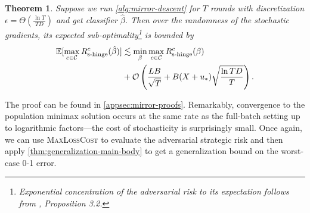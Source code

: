 \documentclass{article}
\newcommand{\costset}{\gC}
\newcommand{\costfunc}{c}
\newcommand{\shingepoprisk}{R_{\textrm{s-hinge}}}
\newcommand{\uinv}{\ensuremath{u_{*}}}
\newcommand{\cinc}{{\costfunc\in\costset}}
\newtheorem{theorem}{Theorem}[section]
\theoremstyle{definition}
\begin{document}
\begin{theorem}
    Suppose we run \cref{alg:mirror-descent} for $T$ rounds with discretization $\epsilon = \Theta\left(\frac{\ln T}{T D}\right)$ and get classifier $\hat\beta$.
    Then over the randomness of the stochastic gradients, its expected sub-optimality\footnote{Exponential concentration of the adversarial risk to its expectation follows from \citet{nemirovski2009robust}, Proposition 3.2.} is bounded by
    \begin{align*}
        \E[\max_{\cinc} \shingepoprisk^{\costfunc}(\hat\beta)] &\lesssim \min_{\beta} \max_{\cinc} \shingepoprisk^{\costfunc}(\beta) \\
        &+\mathcal{O}\left(\frac{LB}{\sqrt{T}}  + B (X+\uinv) \sqrt{\frac{\ln TD}{T}} \right).
    \end{align*}
\end{theorem}
The proof can be found in \cref{appsec:mirror-proofs}. Remarkably, convergence to the population minimax solution occurs at the same rate as the full-batch setting up to logarithmic factors---the cost of stochasticity is surprisingly small. Once again, we can use \textsc{MaxLossCost} to evaluate the adversarial strategic risk and then apply \cref{thm:generalization-main-body} to get a generalization bound on the worst-case 0-1 error.


\end{document}
